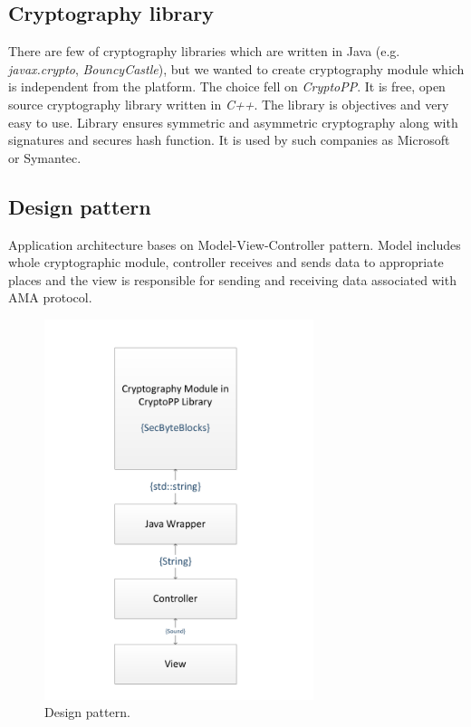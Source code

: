 \documentclass[11pt,titlepage]{article}
\theoremstyle{plain}
\begin{document}
\subsection{Cryptography library}

There are few of cryptography libraries which are written in Java (e.g. \textit{javax.crypto}, \textit{BouncyCastle}), but we wanted to create cryptography module which is independent from the platform. The choice fell on \textit{CryptoPP}. It is free, open source cryptography library written in \textit{C++}. The library is objectives and very easy to use. Library ensures symmetric and asymmetric cryptography along with signatures and secures hash function. It is used by such companies as Microsoft or Symantec.

\subsection{Design pattern}

Application architecture bases on Model-View-Controller pattern. Model includes whole cryptographic module, controller receives and sends data to appropriate places and the view is responsible for sending and receiving data associated with AMA protocol. 

\begin{figure}[H]
	\centering
	\includegraphics[width=0.7\textwidth]{img/MVC.pdf}
	\caption{Design pattern.}
\end{figure}
\end{document}
